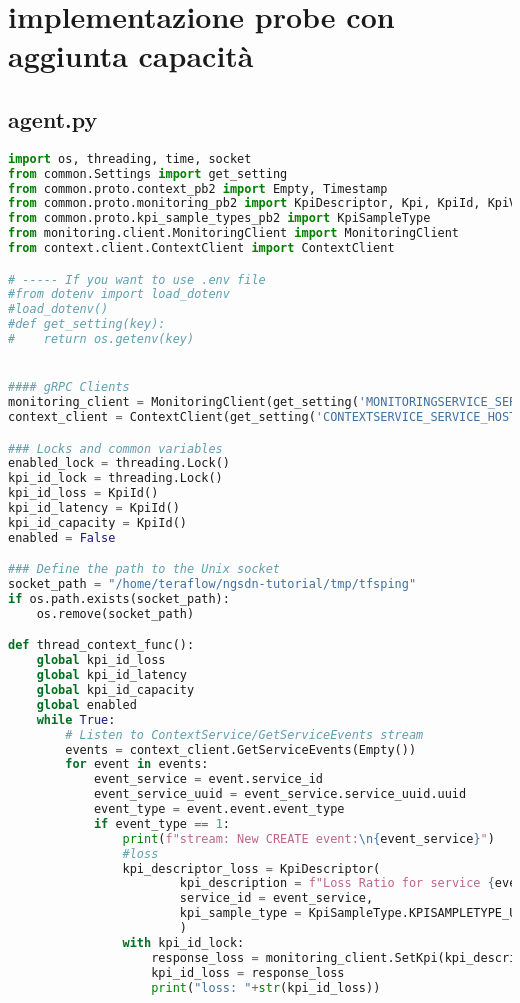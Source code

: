 \section{implementazione probe con aggiunta capacità}
\subsection{agent.py}
\label{cap:agcap}
\begin{lstlisting}[language=Python]
import os, threading, time, socket
from common.Settings import get_setting
from common.proto.context_pb2 import Empty, Timestamp
from common.proto.monitoring_pb2 import KpiDescriptor, Kpi, KpiId, KpiValue
from common.proto.kpi_sample_types_pb2 import KpiSampleType
from monitoring.client.MonitoringClient import MonitoringClient
from context.client.ContextClient import ContextClient

# ----- If you want to use .env file
#from dotenv import load_dotenv
#load_dotenv()
#def get_setting(key):
#    return os.getenv(key)


#### gRPC Clients
monitoring_client = MonitoringClient(get_setting('MONITORINGSERVICE_SERVICE_HOST'), get_setting('MONITORINGSERVICE_SERVICE_PORT_GRPC'))
context_client = ContextClient(get_setting('CONTEXTSERVICE_SERVICE_HOST'), get_setting('CONTEXTSERVICE_SERVICE_PORT_GRPC'))

### Locks and common variables
enabled_lock = threading.Lock()
kpi_id_lock = threading.Lock()
kpi_id_loss = KpiId()
kpi_id_latency = KpiId()
kpi_id_capacity = KpiId()
enabled = False

### Define the path to the Unix socket
socket_path = "/home/teraflow/ngsdn-tutorial/tmp/tfsping"
if os.path.exists(socket_path):
    os.remove(socket_path)

def thread_context_func():
    global kpi_id_loss
    global kpi_id_latency
    global kpi_id_capacity
    global enabled
    while True:
        # Listen to ContextService/GetServiceEvents stream 
        events = context_client.GetServiceEvents(Empty())
        for event in events:
            event_service = event.service_id
            event_service_uuid = event_service.service_uuid.uuid
            event_type = event.event.event_type
            if event_type == 1:
                print(f"stream: New CREATE event:\n{event_service}")
                #loss
                kpi_descriptor_loss = KpiDescriptor(
                        kpi_description = f"Loss Ratio for service {event_service_uuid}",
                        service_id = event_service,
                        kpi_sample_type = KpiSampleType.KPISAMPLETYPE_UNKNOWN
                        )
                with kpi_id_lock:
                    response_loss = monitoring_client.SetKpi(kpi_descriptor_loss)
                    kpi_id_loss = response_loss
                    print("loss: "+str(kpi_id_loss))
                    

\end{lstlisting}

